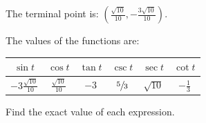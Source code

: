 \documentclass[fleqn,addpoints]{exam}
\begin{document}
\begin{questions}
\begin{solution}
        The terminal point is: $\left( \frac{\sqrt{10}}{10}, -\frac{3 \sqrt{10}}{10} \right)$.

        The values of the functions are:

        \begin{center}
          \begin{tabular}[H]{cccccc}
            \toprule
            $\sin t$                  & $\cos t$               & $\tan t$ & $\csc t$       & $\sec t$    & $\cot t$ \\
            \midrule
            $-3 \frac{\sqrt{10}}{10}$ & $\frac{\sqrt{10}}{10}$ & $-3$     & $\sfrac{5}{3}$ & $\sqrt{10}$ & $- \frac{1}{3}$ \\
            \bottomrule
          \end{tabular}
        \end{center}

      \end{solution}

    \question Find the exact value of each expression.
\end{questions}
\end{document}
